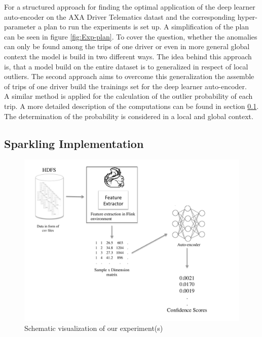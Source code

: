 \documentclass{vldb}
\begin{document}
For a structured approach for finding the optimal application of the deep learner auto-encoder on the AXA Driver Telematics datast and the corresponding hyper-parameter a plan to run the experiments is set up. A simplification of the plan can be seen in figure \ref{fig:Exp-plan}. To cover the question, whether the anomalies can only be found among the trips of one driver or even in more general global context the model is build in two different ways. The idea behind this approach is, that a model build on the entire dataset is to generalized in respect of local outliers. The second approach aims to overcome this generalization the assemble of trips of one driver build the trainings set for the deep learner auto-encoder.\\
A similar method is applied for the calculation of the outlier probability of each trip. A more detailed description of the computations can be found in section \ref{subsec:sparkling-impl}. The determination of the probability is considered in a local and global context.


\subsection{Sparkling Implementation}
\label{subsec:sparkling-impl}

\begin{figure}
\centering
\includegraphics[trim=1cm 0cm 1cm 0.5cm, clip=true, width=\linewidth]{"pics/approach2"}
\caption{Schematic visualization of our experiment(s)}
\label{fig:approach-2}
\end{figure}
\end{document}
